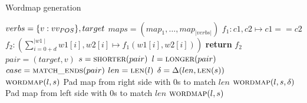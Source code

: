 \algrenewcommand{}
\algrenewcommand{}
\begin{algorithm}
    \caption{Wordmap generation}\label{alg:wordmap}
    \begin{algorithmic}[1]
        \Require $verbs = \{v : v  v_{\uppercase{POS}}\}, target$ 
        \Ensure $maps = (map_{1}, \ldots, map_{|verbs|})$
            \State $f_{1}: c1, c2 \mapsto c1 == c2$
            \State $f_{2}: \left(\sum_{i=0+d}^{\mid w1 \mid} w1[i], w2[i] \mapsto f_{1}(w1[i], w2[i])\right)$
            \State \textbf{return} $f_{2}$
        \EndFunction
        \\

        \State $pair = (target, v)$
        \State $s = \textsc{shorter}(pair)$
        \State $l = \textsc{longer}(pair)$
        \State $case = \textsc{match\_ends}(pair)$ 
        \State $len = \textsc{len}(l)$
        \State $\delta = \Delta(len, \textsc{len}(s))$
        \\


        
            \If{$\delta$}
                        \State $\textsc{wordmap}(l, s)$
                    \State Pad map from right side with 0s to match $len$
                \EndIf
                        \State $\textsc{wordmap}(l, s, \delta)$
                    \State Pad map from left side with 0s to match $len$
                \EndIf
            \Else
                \State $\textsc{wordmap}(l, s)$
            \EndIf
        \EndIf
        \EndFor

    \end{algorithmic}
\end{algorithm}


